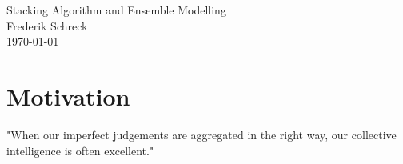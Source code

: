 \documentclass[12pt]{article}
\begin{document}
\begin{center}
{\LARGE Stacking Algorithm and Ensemble Modelling}\\
\vspace{0.5cm}
{\large Frederik Schreck}\\
\vspace{0.5cm}
{\large\today}
\end{center}
\vspace{1cm}


\begin{abstract}
Stacking and Ensemble models currently belong to the most powerful machine learning tools. This paper introduces and discusses the most important concepts of Stacking and Ensembling and the related models in depth. In order to assess their predictive performance in the context of credit risk assessment, an empirical evaluation study is realized on behalf of the German Credit Dataset from the UCI machine learning repository. Results show that Ensembling models, including a Random Forest and a Gradient Boosting model, outperform standard machine learning models on a broad set of evaluation metrics. Different versions of Stacked Generalization models were able to establish better predictions than their level 0 generalizers. Thereby more sophisticated Stacking algorithms could establish even better results. Notably, the restriction of the subset of input predictions for the Stacked Generalization models was ineffective with regards to performance issues. The results strongly reinforce the value of Stacking and Ensembling strategies for prediction problems in credit risk assessment.
\end{abstract}

\section{Motivation}\label{Intro}
"When our imperfect judgements are aggregated in the right way, our collective intelligence is often excellent." \citep[Foreword p.XIV]{surowiecki2005wisdom}\\
\end{document}
